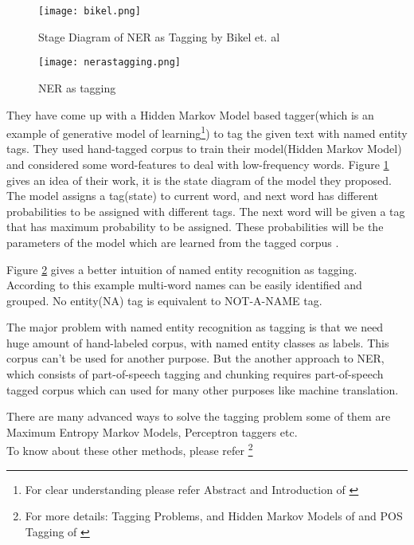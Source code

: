 \documentclass[12pt]{report}
\begin{document}
\begin{figure}[htp]
\centering
\texttt{[image: bikel.png]}
\caption{Stage Diagram of NER as Tagging by Bikel et. al}
\label{NERasT}
\end{figure}


\begin{figure}[htp]
\centering
\texttt{[image: nerastagging.png]}
\caption{NER as tagging}
\label{NERasT2}
\end{figure}

They have come up with a Hidden Markov Model\cite{hmm} based tagger(which is an example of generative model of learning\footnote{ For clear understanding please refer Abstract and Introduction of \cite{Ng}})
 to tag the given text with named entity tags. 
 They used hand-tagged corpus to train their model(Hidden Markov Model) and considered some
 word-features to deal with low-frequency words. Figure \ref{NERasT} gives an idea of their work, it
  is the state diagram of the model they proposed. The model assigns a tag(state) to current word, and next word has different probabilities
   to be assigned with different tags. The next word will be given a tag that has maximum
    probability to be assigned.
These probabilities will be the parameters of 
   the model which are learned\cite{Videos} from the tagged corpus .
 \par Figure \ref{NERasT2} gives a better intuition of named entity recognition as tagging. According to this example
   multi-word names can be easily identified and grouped. No entity(NA) tag is equivalent to  NOT-A-NAME tag. 
\par The major problem with named entity recognition as tagging is that  we need huge 
 amount of hand-labeled corpus, with named entity classes as labels. This corpus can't be 
 used for another purpose. But the another approach to NER, which consists of part-of-speech
  tagging and chunking requires part-of-speech tagged corpus which can used for many other
   purposes like machine translation.
\par There are many advanced ways to solve the tagging problem some of them are Maximum
Entropy Markov Models, Perceptron taggers etc. \\To know about these other methods, please refer \footnote{For more details: Tagging Problems, and Hidden Markov Models of \cite{mc} and POS Tagging of \cite{SNLP}}\\
\vspace{2in}
\end{document}
